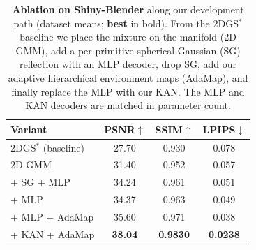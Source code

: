 \begin{table}[t]
\centering
\caption{\textbf{Ablation on Shiny-Blender} along our development path (dataset means;
\textbf{best} in bold). From the 2DGS$^{*}$ baseline we place the mixture on the manifold (2D GMM),
add a per-primitive spherical-Gaussian (SG) reflection with an MLP decoder, drop SG, add our
adaptive hierarchical environment maps (AdaMap), and finally replace the MLP with our KAN. The MLP
and KAN decoders are matched in parameter count.}
\label{tab:ablation}
\begin{tabular}{lccc}
\toprule
Variant & PSNR$\uparrow$ & SSIM$\uparrow$ & LPIPS$\downarrow$ \\
\midrule
2DGS$^{*}$ (baseline) & 27.70 & 0.930 & 0.078 \\
\quad 2D GMM          & 31.40 & 0.952 & 0.057 \\
\quad + SG + MLP      & 34.24 & 0.961 & 0.051 \\
\quad + MLP           & 34.37 & 0.963 & 0.049 \\
\quad + MLP + AdaMap  & 35.60 & 0.971 & 0.038 \\
\quad + KAN + AdaMap  & \textbf{38.04} & \textbf{0.9830} & \textbf{0.0238} \\
\bottomrule
\end{tabular}
\end{table}
